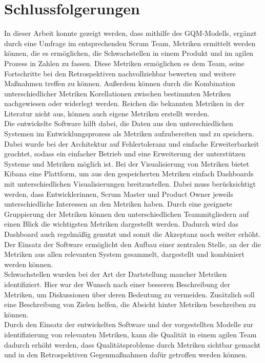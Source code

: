 \chapter{Schlussfolgerungen}

In dieser Arbeit konnte gezeigt werden, dass mithilfe des \ac{GQM}-Modells, ergänzt durch eine Umfrage im entsprechenden Scrum Team, Metriken ermittelt werden können, die es ermöglichen, die Schwachstellen in einem Produkt und im agilen Prozess in Zahlen zu fassen.
Diese Metriken ermöglichen es dem Team, seine Fortschritte bei den Retrospektiven nachvollziehbar bewerten und weitere Maßnahmen treffen zu können.
Außerdem können durch die Kombination unterschiedlicher Metriken Korellationen zwischen bestimmten Metriken nachgewiesen oder widerlegt werden.
Reichen die bekannten Metriken in der Literatur nicht aus, können auch eigene Metriken erstellt werden.
\\
Die entwickelte Software hilft dabei, die Daten aus den unterschiedlichen Systemen im Entwicklungsprozess als Metriken aufzubereiten und zu speichern.
Dabei wurde bei der Architektur auf Fehlertoleranz und einfache Erweiterbarkeit geachtet, sodass ein einfacher Betrieb und eine Erweiterung der unterstützen Systeme und Metriken möglich ist.
Bei der Visualisierung von Metriken bietet Kibana eine Plattform, um aus den gespeicherten Metriken einfach Dashboards mit unterschiedlichen Visualisierungen breitzustellen.
Dabei muss berücksichtigt werden, dass Entwicklerinnen, Scrum Master und Product Owner jeweils unterschiedliche Interessen an den Metriken haben.
Durch eine geeignete Gruppierung der Metriken können den unterschiedlichen Teammitgliedern auf einen Blick die wichtigsten Metriken dargestellt werden.
Dadurch wird das Dashboard auch regelmäßig genutzt und somit die Akzeptanz noch weiter erhöht.
Der Einsatz der Software ermöglicht den Aufbau einer zentralen Stelle, an der die Metriken aus allen relevanten System gesammelt, dargestellt und kombiniert werden können.
\\
Schwachstellen wurden bei der Art der Dartstellung mancher Metriken identifiziert.
Hier war der Wunsch nach einer besseren Beschreibung der Metriken, um Diskussionen über deren Bedeutung zu vermeiden.
Zusätzlich soll eine Beschreibung von Zielen helfen, die Absicht hinter Metriken beschreiben zu können.
\\
Durch den Einsatz der entwickelten Software und der vorgestellten Modelle zur identifizierung von relevanten Metriken, kann die Qualität in einem agilen Team dadurch erhöht werden, dass Qualitätsprobleme durch Metriken sichtbar gemacht und in den Retrospektiven Gegenmaßnahmen dafür getroffen werden können.
